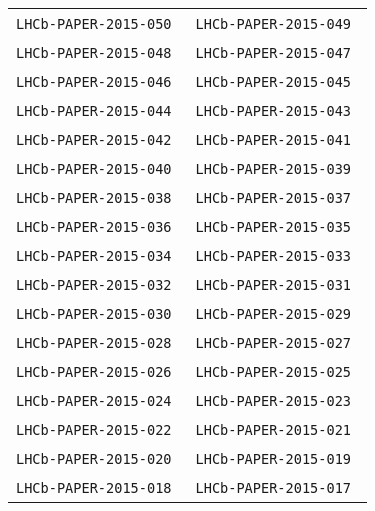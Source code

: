 \begin{center}
\begin{longtable}{ll}
\texttt{LHCb-PAPER-2015-050}~\cite{LHCb-PAPER-2015-050} &
\texttt{LHCb-PAPER-2015-049}~\cite{LHCb-PAPER-2015-049} \\
\texttt{LHCb-PAPER-2015-048}~\cite{LHCb-PAPER-2015-048} &
\texttt{LHCb-PAPER-2015-047}~\cite{LHCb-PAPER-2015-047} \\
\texttt{LHCb-PAPER-2015-046}~\cite{LHCb-PAPER-2015-046} &
\texttt{LHCb-PAPER-2015-045}~\cite{LHCb-PAPER-2015-045} \\
\texttt{LHCb-PAPER-2015-044}~\cite{LHCb-PAPER-2015-044} &
\texttt{LHCb-PAPER-2015-043}~\cite{LHCb-PAPER-2015-043} \\
\texttt{LHCb-PAPER-2015-042}~\cite{LHCb-PAPER-2015-042} &
\texttt{LHCb-PAPER-2015-041}~\cite{LHCb-PAPER-2015-041} \\
\texttt{LHCb-PAPER-2015-040}~\cite{LHCb-PAPER-2015-040} &
\texttt{LHCb-PAPER-2015-039}~\cite{LHCb-PAPER-2015-039} \\
\texttt{LHCb-PAPER-2015-038}~\cite{LHCb-PAPER-2015-038} &
\texttt{LHCb-PAPER-2015-037}~\cite{LHCb-PAPER-2015-037} \\
\texttt{LHCb-PAPER-2015-036}~\cite{LHCb-PAPER-2015-036} &
\texttt{LHCb-PAPER-2015-035}~\cite{LHCb-PAPER-2015-035} \\
\texttt{LHCb-PAPER-2015-034}~\cite{LHCb-PAPER-2015-034} &
\texttt{LHCb-PAPER-2015-033}~\cite{LHCb-PAPER-2015-033} \\
\texttt{LHCb-PAPER-2015-032}~\cite{LHCb-PAPER-2015-032} &
\texttt{LHCb-PAPER-2015-031}~\cite{LHCb-PAPER-2015-031} \\
\texttt{LHCb-PAPER-2015-030}~\cite{LHCb-PAPER-2015-030} &
\texttt{LHCb-PAPER-2015-029}~\cite{LHCb-PAPER-2015-029} \\
\texttt{LHCb-PAPER-2015-028}~\cite{LHCb-PAPER-2015-028} &
\texttt{LHCb-PAPER-2015-027}~\cite{LHCb-PAPER-2015-027} \\
\texttt{LHCb-PAPER-2015-026}~\cite{LHCb-PAPER-2015-026} &
\texttt{LHCb-PAPER-2015-025}~\cite{LHCb-PAPER-2015-025} \\
\texttt{LHCb-PAPER-2015-024}~\cite{LHCb-PAPER-2015-024} &
\texttt{LHCb-PAPER-2015-023}~\cite{LHCb-PAPER-2015-023} \\
\texttt{LHCb-PAPER-2015-022}~\cite{LHCb-PAPER-2015-022} &
\texttt{LHCb-PAPER-2015-021}~\cite{LHCb-PAPER-2015-021} \\
\texttt{LHCb-PAPER-2015-020}~\cite{LHCb-PAPER-2015-020} &
\texttt{LHCb-PAPER-2015-019}~\cite{LHCb-PAPER-2015-019} \\
\texttt{LHCb-PAPER-2015-018}~\cite{LHCb-PAPER-2015-018} &
\texttt{LHCb-PAPER-2015-017}~\cite{LHCb-PAPER-2015-017} \\

\end{longtable}
\end{center}
